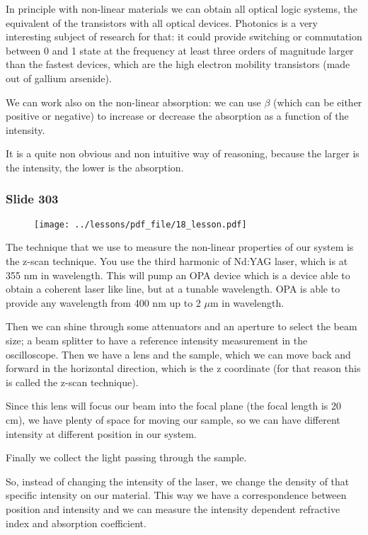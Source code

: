 \documentclass[../main/main.tex]{subfiles}
\begin{document}
In principle with non-linear materials we can obtain all optical logic systems, the equivalent of the transistors with all optical devices. Photonics is a very interesting subject of research for that:  it could provide switching or commutation between 0 and 1 state at the frequency at least three orders of magnitude larger than the fastest devices, which are the high electron mobility transistors (made out of gallium arsenide). 

We can work also on the non-linear absorption: we can use $\beta$ (which can be either positive or negative) to increase or decrease the absorption as a function of the intensity. 

It is a quite non obvious and non intuitive way of reasoning, because the larger is the intensity, the lower is the absorption.

\newpage

\subsubsection{Slide 303}

\begin{figure}[h!]
\centering
\texttt{[image: ../lessons/pdf\_file/18\_lesson.pdf]}
\end{figure}


The technique that we use to measure the non-linear properties of our system is the z-scan technique.
You use the third harmonic of Nd:YAG laser, which is at 355 nm in wavelength. This will pump an OPA device which is a device able to obtain a coherent laser like line, but at a tunable wavelength. 
OPA is able to provide any wavelength from 400 nm up to 2 $\mu$m in wavelength.

Then we can shine through some attenuators and an aperture to select the beam size; a beam splitter to have a reference intensity measurement in the oscilloscope. 
Then we have a lens and the sample, which we can move back and forward in the horizontal direction, which is the z coordinate (for that reason this is called the z-scan technique).

Since this lens will focus our beam into the focal plane (the focal length is 20 cm), we have plenty of space for moving our sample, so we can have different intensity at different position in our system.

Finally we collect the light passing through the sample. 

So, instead of changing the intensity of the laser, we change the density of that specific intensity on our material. This way we have a correspondence between position and intensity and we can measure the intensity dependent refractive index and absorption coefficient.
\end{document}

